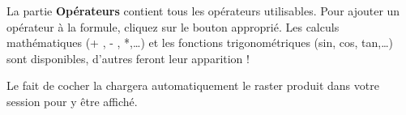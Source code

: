 La partie \textbf{Opérateurs} contient tous les opérateurs utilisables. Pour ajouter un opérateur à la formule, cliquez sur le bouton approprié. Les calculs mathématiques (+ , - , *,\dots) et les fonctions trigonométriques (sin, cos, tan,\dots) sont disponibles, d'autres feront leur apparition !

Le fait de cocher la  chargera automatiquement le raster produit dans votre session pour y être affiché.

  \FloatBarrier
